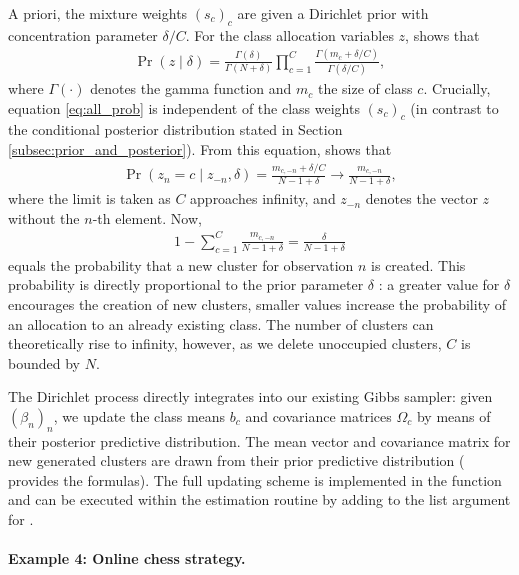 \documentclass[article]{jss}
\newcommand{\fct}[1]{\code{#1()}}
\begin{document}
A priori, the mixture weights $(s_c)_c$ are given a Dirichlet prior with concentration parameter $\delta/C$. For the class allocation variables $z$, \cite{Rasmussen:2000} shows that
\begin{align}
  \label{eq:all_prob}
  \Pr(z \mid \delta) = \frac{\Gamma(\delta)}{\Gamma(N+\delta)} \prod_{c=1}^C \frac{\Gamma(m_c + \delta/C)}{\Gamma(\delta/C)},
\end{align}
where $\Gamma(\cdot)$ denotes the gamma function and $m_c$ the size of class $c$. Crucially, equation \eqref{eq:all_prob} is independent of the class weights $(s_c)_c$ (in contrast to the conditional posterior distribution stated in Section \ref{subsec:prior_and_posterior}). From this equation, \cite{Li:2019} shows that
\begin{align*}
  \Pr(z_n = c \mid z_{-n}, \delta) = \frac{m_{c,-n} + \delta/C}{N-1+\delta} \to \frac{m_{c,-n}}{N-1+\delta},
\end{align*}
where the limit is taken as $C$ approaches infinity, and $z_{-n}$ denotes the vector $z$ without the $n$-th element. Now,
\begin{align*}
  1 - \sum_{c = 1}^C \frac{m_{c,-n}}{N-1+\delta} = \frac{\delta}{N-1+\delta}
\end{align*}
equals the probability that a new cluster for observation $n$ is created. This probability is directly proportional to the prior parameter $\delta$ \citep{Neal:2000}: a greater value for $\delta$ encourages the creation of new clusters, smaller values increase the probability of an allocation to an already existing class. The number of clusters can theoretically rise to infinity, however, as we delete unoccupied clusters, $C$ is bounded by $N$.

The Dirichlet process directly integrates into our existing Gibbs sampler: given $(\beta_n)_n$, we update the class means $b_c$ and covariance matrices $\Omega_c$ by means of their posterior predictive distribution. The mean vector and covariance matrix for new generated clusters are drawn from their prior predictive distribution (\cite{Li:2019} provides the formulas). The full updating scheme is implemented in the function \fct{update\_classes\_dp} and can be executed within the estimation routine \fct{fit\_model} by adding  to the list argument for .

\paragraph{Example 4: Online chess strategy.}
\end{document}
